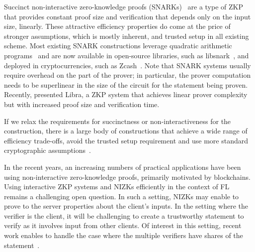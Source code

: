 \documentclass[11pt]{article}
\begin{document}
Succinct
non-interactive zero-knowledge proofs (SNARKs)~\cite{Bitansky:2012:ECR:2090236.2090263} are a type of ZKP that provides constant proof size and verification that depends only on the input size, linearly. These attractive efficiency properties do come at the price of stronger assumptions, which is mostly inherent, %
and trusted setup in all existing scheme. Most existing SNARK constructions leverage quadratic arithmetic programs~\cite{DBLP:conf/eurocrypt/GennaroGP013,DBLP:journals/cacm/ParnoHG016,DBLP:conf/sp/CostelloFHKKNPZ15} and are now available in open-source libraries, such as libsnark~\cite{libsnark}, and deployed in cryptocurrencies, such as Zcash~\cite{DBLP:conf/sp/Ben-SassonCG0MTV14}. Note that SNARK systems usually require overhead on the part of the prover; in particular, the prover computation needs to be superlinear in the size of the circuit for the statement being proven. Recently, \citet{DBLP:conf/crypto/XieZZPS19} presented Libra, a ZKP system that achieves linear prover complexity but with increased proof size and verification time. 

If we relax the requirements for succinctness or non-interactiveness for the construction, there is a large body of constructions that achieve a wide range of efficiency trade-offs, avoid the trusted setup requirement and use more standard cryptographic assumptions~\cite{DBLP:conf/sp/BunzBBPWM18,DBLP:conf/sp/WahbyTSTW18,Ames:2017:LLS:3133956.3134104,DBLP:conf/crypto/Ben-SassonBHR19}.


In the recent years, an increasing numbers of practical applications have been using non-interactive zero-knowledge proofs, primarily motivated by blockchains. Using interactive ZKP systems and NIZKs efficiently in the context of FL remains a challenging open question. In such a setting, NIZKs may enable to prove to the server properties about the client's inputs. In the setting where the verifier is the client, it will be challenging to create a trustworthy statement to verify as it involves input from other clients. Of interest in this setting, recent work enables to handle the case where the multiple verifiers have shares of the statement~\cite{DBLP:conf/crypto/BonehBCGI19}. 
\end{document}
